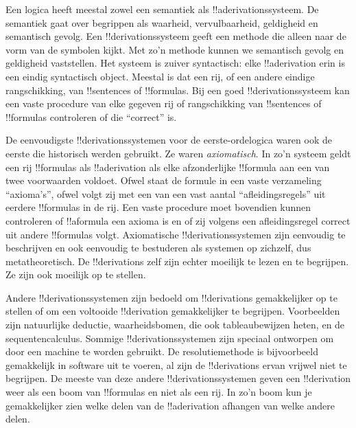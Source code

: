 \documentclass[../../../include/open-logic-section]{subfiles}
\begin{document}
      {}
      {}


Een logica heeft meestal zowel een semantiek als
!!a{derivation}ssysteem. De semantiek gaat over begrippen als waarheid,
vervulbaarheid, geldigheid en semantisch gevolg. Een
!!{derivation}ssysteem geeft een methode die alleen naar de vorm van de
symbolen kijkt. Met zo'n methode kunnen we semantisch gevolg en
geldigheid vaststellen. Het systeem is zuiver syntactisch: elke
!!a{derivation} erin is een eindig syntactisch object. Meestal is dat
een rij, of een andere eindige rangschikking, van !!{sentence}s of
!!{formula}s. Bij een goed !!{derivation}ssysteem kan een vaste
procedure van elke gegeven rij of rangschikking van !!{sentence}s of
!!{formula}s controleren of die ``correct'' is.

De eenvoudigste !!{derivation}ssystemen voor de eerste-ordelogica waren
ook de eerste die historisch werden gebruikt. Ze waren
\emph{axiomatisch}. In zo'n systeem geldt een rij !!{formula}s als
!!a{derivation} als elke afzonderlijke !!{formula} aan een van twee
voorwaarden voldoet. Ofwel staat de formule in een vaste verzameling
``axioma's'', ofwel volgt zij met een van een vast aantal
``afleidingsregels'' uit eerdere !!{formula}s in de rij. Een vaste
procedure moet bovendien kunnen controleren of !!a{formula} een axioma
is en of zij volgens een afleidingsregel correct uit andere
!!{formula}s volgt. Axiomatische !!{derivation}ssystemen zijn eenvoudig
te beschrijven en ook eenvoudig te bestuderen als systemen op zichzelf,
dus metatheoretisch. De !!{derivation}s
zelf zijn echter moeilijk te lezen en te begrijpen. Ze zijn ook
moeilijk op te stellen.

Andere !!{derivation}ssystemen zijn bedoeld om !!{derivation}s
gemakkelijker op te stellen of om een voltooide !!{derivation}
gemakkelijker te begrijpen. Voorbeelden zijn natuurlijke deductie,
waarheidsbomen, die ook tableaubewijzen heten, en de sequentencalculus.
Sommige !!{derivation}ssystemen zijn speciaal ontworpen om door een
machine te worden gebruikt. De resolutiemethode is bijvoorbeeld
gemakkelijk in software uit te voeren, al zijn de !!{derivation}s
ervan vrijwel niet te begrijpen. De meeste van deze andere
!!{derivation}ssystemen geven een !!{derivation} weer als een boom van
!!{formula}s en niet als een rij. In zo'n boom kun je gemakkelijker
zien welke delen van de !!a{derivation} afhangen van welke andere
delen.
\end{document}
